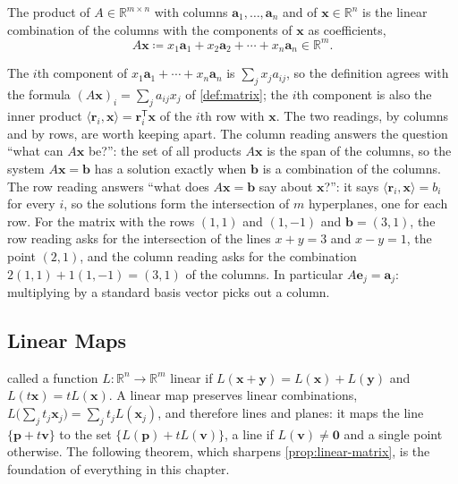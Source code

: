 \begin{definition}
\label{def:matrix-vector}
The product of $A\in\mathbb R^{m\times n}$ with columns $\mathbf a_1,\ldots,\mathbf a_n$ and of $\mathbf x\in\mathbb R^n$ is the linear combination of the columns with the components of $\mathbf x$ as coefficients,
\[
A\mathbf x\coloneqq x_1\mathbf a_1+x_2\mathbf a_2+\cdots+x_n\mathbf a_n\in\mathbb R^m .
\]
\end{definition}

The $i$th component of $x_1\mathbf a_1+\cdots+x_n\mathbf a_n$ is $\sum_jx_ja_{ij}$, so the definition agrees with the formula $(A\mathbf x)_i=\sum_ja_{ij}x_j$ of \cref{def:matrix}; the $i$th component is also the inner product $\langle\mathbf r_i,\mathbf x\rangle=\mathbf r_i^{\mathsf T}\mathbf x$ of the $i$th row with $\mathbf x$. The two readings, by columns and by rows, are worth keeping apart. The column reading answers the question ``what can $A\mathbf x$ be?'': the set of all products $A\mathbf x$ is the span of the columns, so the system $A\mathbf x=\mathbf b$ has a solution exactly when $\mathbf b$ is a combination of the columns. The row reading answers ``what does $A\mathbf x=\mathbf b$ say about $\mathbf x$?'': it says $\langle\mathbf r_i,\mathbf x\rangle=b_i$ for every $i$, so the solutions form the intersection of $m$ hyperplanes, one for each row. For the matrix with the rows $(1,1)$ and $(1,-1)$ and $\mathbf b=(3,1)$, the row reading asks for the intersection of the lines $x+y=3$ and $x-y=1$, the point $(2,1)$, and the column reading asks for the combination $2(1,1)+1(1,-1)=(3,1)$ of the columns. In particular $A\mathbf e_j=\mathbf a_j$: multiplying by a standard basis vector picks out a column.

\subsection{Linear Maps}

 called a function $L\colon\mathbb R^n\to\mathbb R^m$ linear if $L(\mathbf x+\mathbf y)=L(\mathbf x)+L(\mathbf y)$ and $L(t\mathbf x)=tL(\mathbf x)$. A linear map preserves linear combinations, $L\bigl(\sum_jt_j\mathbf x_j\bigr)=\sum_jt_jL(\mathbf x_j)$, and therefore lines and planes: it maps the line $\{\mathbf p+t\mathbf v\}$ to the set $\{L(\mathbf p)+tL(\mathbf v)\}$, a line if $L(\mathbf v)\ne\mathbf 0$ and a single point otherwise. The following theorem, which sharpens \cref{prop:linear-matrix}, is the foundation of everything in this chapter.

